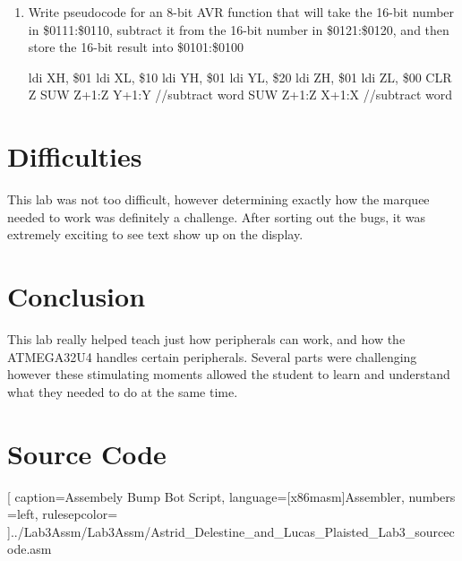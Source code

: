 \documentclass[12pt,letterpaper]{article}
\begin{document}
\begin{enumerate}
	
	\item 
	Write pseudocode for an 8-bit AVR function that will take the 16-bit number in \$0111:\$0110, subtract it from the 16-bit number in \$0121:\$0120, and then store the 16-bit result into \$0101:\$0100

	ldi XH, \$01 \newline
	ldi XL, \$10 \newline
	ldi YH, \$01 \newline
	ldi YL, \$20 \newline
	ldi ZH, \$01 \newline
	ldi ZL, \$00 \newline
	CLR Z
	SUW Z+1:Z Y+1:Y //subtract word
	SUW Z+1:Z X+1:X //subtract word

    
	

\end{enumerate}

\section{Difficulties}
This lab was not too difficult, however determining exactly how the marquee needed to work was definitely a challenge. After sorting out the bugs, it was extremely exciting to see text show up on the display.  

\section{Conclusion}
This lab really helped teach just how peripherals can work, and how the ATMEGA32U4 handles certain peripherals. Several parts were challenging however these stimulating moments allowed the student to learn and understand what they needed to do at the same time. 

\section{Source Code}%

[
caption=Assembely Bump Bot Script,
language={[x86masm]Assembler},
numbers =left,
rulesepcolor=\color{blue}
]{../Lab3Assm/Lab3Assm/Astrid_Delestine_and_Lucas_Plaisted_Lab3_sourcecode.asm}
\end{document}
